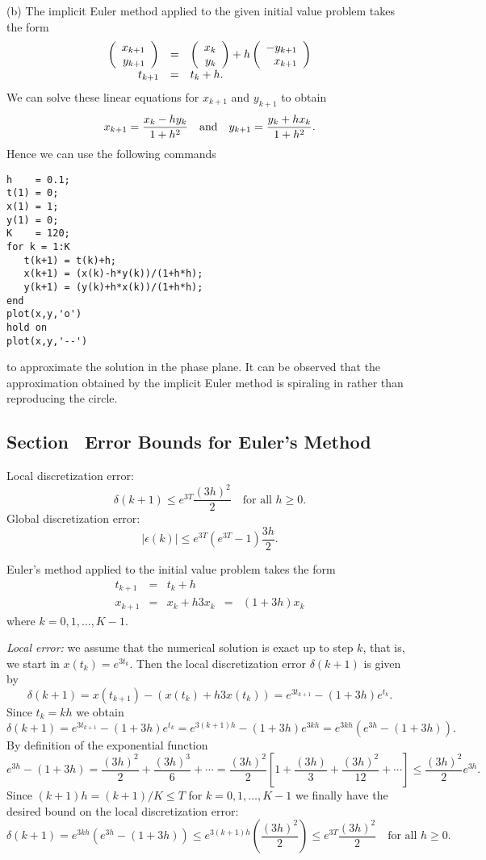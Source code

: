 (b)  The implicit Euler method applied to the given initial value
problem takes the form
\[
\begin{array}{rcl}
\left(\begin{array}{r} x_{k+1} \\ y_{k+1}\end{array}\right) & = &
\left(\begin{array}{r} x_k \\ y_k\end{array}\right) + h \left(\begin{array}{r} -y_{k+1} \\ x_{k+1}\end{array}\right)\\
t_{k+1} & = & t_k + h.
\end{array}
\]
We can solve these linear equations for $x_{k+1}$ and $y_{k+1}$ to obtain
\[
x_{k+1} = \frac{x_k-hy_k}{1+h^2} \quad\mbox{and}\quad
y_{k+1} = \frac{y_k+hx_k}{1+h^2}.
\]
Hence we can use the following \Matlab commands
\begin{verbatim}
h    = 0.1;
t(1) = 0;
x(1) = 1;
y(1) = 0;
K    = 120;
for k = 1:K
   t(k+1) = t(k)+h;
   x(k+1) = (x(k)-h*y(k))/(1+h*h);
   y(k+1) = (y(k)+h*x(k))/(1+h*h);
end
plot(x,y,'o')
hold on
plot(x,y,'--')
\end{verbatim}
to approximate the solution in the phase plane.  It can be observed
that the approximation obtained by the implicit Euler method is
spiraling in rather than reproducing the circle.




\subsection*{Section~\protect{\ref{sec:EEEM}} Error Bounds for Euler's Method}

 \ans Local discretization error:
\[
\delta(k+1) \le
e^{3T}\frac{(3h)^2}{2} \quad \mbox{for all $h\ge 0$.}
\]
Global discretization error:
\[
|\epsilon(k)| \le e^{3T}(e^{3T}-1)\frac{3h}{2}.
\]

\soln Euler's method applied to the initial value problem takes the form
\[
\begin{array}{rclcl}
t_{k+1} & = & t_k+h & & \\
x_{k+1} & = & x_k + h 3 x_k & = & (1+3h)x_k
\end{array}
\]
where $k=0,1,\ldots,K-1$.

{\em Local error:} we assume that the
numerical solution is exact up to step $k$, that is,
we start in $x(t_k)=e^{3t_k}$.  Then the local discretization error
$\delta(k+1)$ is given by
\[
\delta(k+1) = x(t_{k+1}) - (x(t_k) + h 3x(t_k))=
e^{3t_{k+1}} - (1+3h)e^{t_k}.
\]
Since $t_k = kh$ we obtain
\[
\delta(k+1) = e^{3t_{k+1}} - (1+3h)e^{t_k} =
e^{3(k+1)h} - (1+3h)e^{3kh} = e^{3kh}(e^{3h}-(1+3h)).
\]
By definition of the exponential function
\[
e^{3h}-(1+3h) = \frac{(3h)^2}{2}+\frac{(3h)^3}{6}+\cdots =
\frac{(3h)^2}{2}\left[ 1+\frac{(3h)}{3}+\frac{(3h)^2}{12}+\cdots\right]
\le \frac{(3h)^2}{2}e^{3h}.
\]
Since $(k+1)h=(k+1)/K\le T$ for $k=0,1,\ldots,K-1$ we finally have the
desired bound on the local discretization error:
\[
\delta(k+1) = e^{3kh}(e^{3h}-(1+3h)) \le
e^{3(k+1)h}\left(\frac{(3h)^2}{2}\right)\le
e^{3T}\frac{(3h)^2}{2} \quad \mbox{for all $h\ge 0$.}
\]

